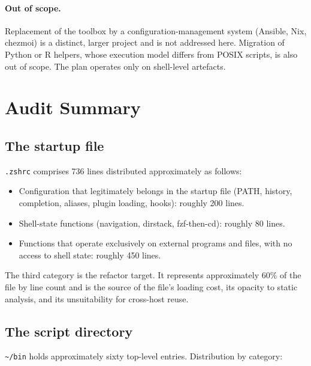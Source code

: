 \documentclass[11pt,letterpaper]{scrartcl}
\begin{document}
\paragraph{Out of scope.} Replacement of the toolbox by a
configuration-management system (Ansible, Nix, chezmoi) is a
distinct, larger project and is not addressed here. Migration of
Python or R helpers, whose execution model differs from POSIX
scripts, is also out of scope. The plan operates only on shell-level
artefacts.

\section{Audit Summary}

\subsection{The startup file}

\texttt{.zshrc} comprises 736 lines distributed approximately as
follows:

\begin{itemize}
  \item Configuration that legitimately belongs in the startup file
        (PATH, history, completion, aliases, plugin loading, hooks):
        roughly 200 lines.
  \item Shell-state functions (navigation, dirstack, fzf-then-cd):
        roughly 80 lines.
  \item Functions that operate exclusively on external programs and
        files, with no access to shell state:
        roughly 450 lines.
\end{itemize}

The third category is the refactor target. It represents
approximately 60\% of the file by line count and is the source of
the file's loading cost, its opacity to static analysis, and its
unsuitability for cross-host reuse.

\subsection{The script directory}

\texttt{\textasciitilde/bin} holds approximately sixty top-level
entries. Distribution by category:
\end{document}
